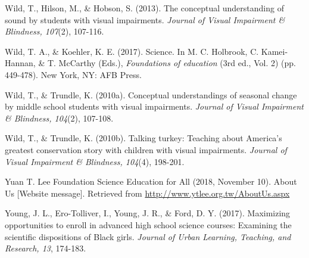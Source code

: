 \documentclass[11.5pt]{sig-alternate} %
\begin{document}
Wild, T., Hilson, M., \& Hobson, S. (2013). The conceptual understanding of sound by students with visual impairments. \textit{Journal of Visual Impairment \& Blindness, 107}(2), 107-116.

Wild, T. A., \& Koehler, K. E. (2017). Science. In M. C. Holbrook, C. Kamei-Hannan, \& T. McCarthy (Eds.), \textit{Foundations of education} (3rd ed., Vol. 2) (pp. 449-478). New York, NY: AFB Press.

Wild, T., \& Trundle, K. (2010a). Conceptual understandings of seasonal change by middle school students with visual impairments. \textit{Journal of Visual Impairment \& Blindness, 104}(2), 107-108.

Wild, T., \& Trundle, K. (2010b). Talking turkey: Teaching about America’s greatest conservation story with children with visual impairments. \textit{Journal of Visual Impairment \& Blindness, 104}(4), 198-201.

Yuan T. Lee Foundation Science Education for All (2018, November 10). About Us [Website message]. Retrieved from \url{http://www.ytlee.org.tw/AboutUs.aspx}

Young, J. L., Ero-Tolliver, I., Young, J. R., \& Ford, D. Y. (2017). Maximizing opportunities to enroll in advanced high school science courses: Examining the scientific dispositions of Black girls. \textit{Journal of Urban Learning, Teaching, and Research, 13}, 174-183.
\end{document}
